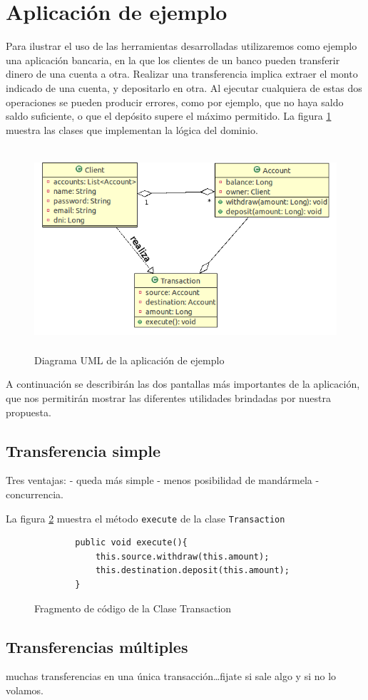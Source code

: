 \section{Aplicación de ejemplo}
Para ilustrar el uso de las herramientas desarrolladas utilizaremos como ejemplo
una aplicación bancaria, en la que los clientes de un banco pueden transferir
dinero de una cuenta a otra. 
Realizar una transferencia implica extraer el
monto indicado de una cuenta, y depositarlo en otra. 
Al ejecutar cualquiera de estas dos operaciones se pueden producir errores,
como por ejemplo, que no haya saldo saldo suficiente, o que el depósito supere
el máximo permitido.
La figura \ref{example} muestra las clases que implementan la lógica del
dominio.

	\begin{figure}[h!]
		\centering
		\includegraphics[width=500px, height=285px]{img/transaccion}
		\caption{Diagrama UML de la aplicación de ejemplo}
		\label{example}
	\end{figure}	

A continuación se describirán las dos pantallas más importantes de la
aplicación, que nos permitirán mostrar las diferentes utilidades brindadas por
nuestra propuesta.
 
\subsection{Transferencia simple} 
	Tres ventajas:
	- queda más simple
	- menos posibilidad de mandármela
	- concurrencia.

La figura \ref{executeTransaction} muestra el método  \lstinline|execute| de la
clase \lstinline|Transaction| \begin{figure}[h]
	\begin{lstlisting}
		public void execute(){
			this.source.withdraw(this.amount);
			this.destination.deposit(this.amount);
		}
	\end{lstlisting}
	\caption{Fragmento de código de la Clase Transaction}
	\label{executeTransaction}
\end{figure}
  	
\subsection{Transferencias múltiples}
	muchas transferencias en una única transacción\ldots fijate si sale algo y si no
	lo volamos.

